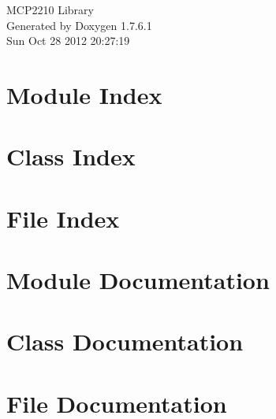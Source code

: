 \documentclass[a4paper]{book}
\begin{document}
\hypersetup{pageanchor=false,citecolor=blue}
\begin{titlepage}
\vspace*{7cm}
\begin{center}
{\Large \-M\-C\-P2210 \-Library }\\
\vspace*{1cm}
{\large \-Generated by Doxygen 1.7.6.1}\\
\vspace*{0.5cm}
{\small Sun Oct 28 2012 20:27:19}\\
\end{center}
\end{titlepage}
\clearemptydoublepage
{}
\tableofcontents
\clearemptydoublepage
{}
\hypersetup{pageanchor=true,citecolor=blue}
\chapter{\-Module \-Index}

\chapter{\-Class \-Index}

\chapter{\-File \-Index}

\chapter{\-Module \-Documentation}

\chapter{\-Class \-Documentation}











\chapter{\-File \-Documentation}






\printindex
\end{document}
